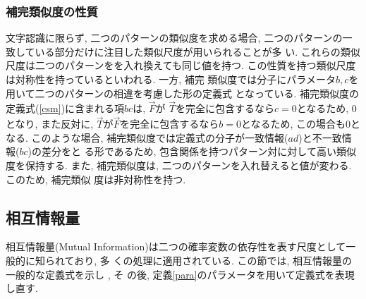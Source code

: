 \subsubsection{補完類似度の性質} 
文字認識に限らず, 二つのパターンの類似度を求める場合, 
二つのパターンの一致している部分だけに注目した類似尺度が用いられることが多
い. 
これらの類似尺度は二つのパターンをを入れ換えても同じ値を持つ. 
この性質を持つ類似尺度は対称性を持っているといわれる.
一方, 補完
類似度では分子にパラメータ$b,c$を用いて二つのパターンの相違を考慮した形の定義式
となっている. 補完類似度の定義式(\ref{csm})に含まれる項$bc$は, $\vec{F}$が
$\vec{T}$を完全に包含するなら$c=0$となるため, 0となり, また反対に, 
$\vec{T}$が$\vec{F}$を完全に包含するなら$b=0$となるため, この場合も0となる. 
このような場合, 補完類似度では定義式の分子が一致情報($ad$)と不一致情報($bc$)の差分をと
る形であるため, 包含関係を持つパターン対に対して高い類似度を保持する. 
また, 補完類似度は, 二つのパターンを入れ替えると値が変わる. このため, 補完類似
度は非対称性を持つ. 

\subsection{相互情報量}
相互情報量(Mutual Information)は二つの確率変数の依存性を表す尺度として一
般的に知られており, 多
くの処理に適用されている\cite{Nagao96,Manning99,Matsumoto00}. 
この節では, 相互情報量の一般的な定義式を示し
\cite{Honda65,Nakagawa92}, そ
の後, 定義\ref{para}のパラメータを用いて定義式を表現し直す. 

